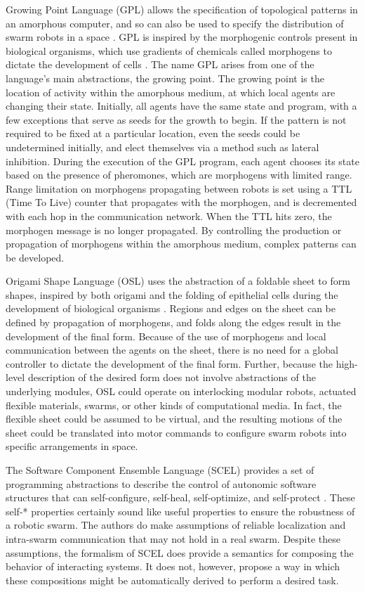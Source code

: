 \documentclass[]{article}
\begin{document}
Growing Point Language (GPL) allows the specification of topological patterns in an amorphous computer, and so can also be used to specify the distribution of swarm robots in a space \cite{nagpal2004engineering}. 
GPL is inspired by the morphogenic controls present in biological organisms, which use gradients of chemicals called morphogens to dictate the development of cells \cite{turing1952chemical}.
The name GPL arises from one of the language's main abstractions, the growing point. 
The growing point is the location of activity within the amorphous medium, at which local agents are changing their state. 
Initially, all agents have the same state and program, with a few exceptions that serve as seeds for the growth to begin. 
If the pattern is not required to be fixed at a particular location, even the seeds could be undetermined initially, and elect themselves via a method such as lateral inhibition. 
During the execution of the GPL program, each agent chooses its state based on the presence of pheromones, which are morphogens with limited range. 
Range limitation on morphogens propagating between robots is set using a TTL (Time To Live) counter that propagates with the morphogen, and is decremented with each hop in the communication network. 
When the TTL hits zero, the morphogen message is no longer propagated. 
By controlling the production or propagation of morphogens within the amorphous medium, complex patterns can be developed. 

Origami Shape Language (OSL) uses the abstraction of a foldable sheet to form shapes, inspired by both origami and the folding of epithelial cells during the development of biological organisms \cite{nagpal2004engineering, nagpal2001programmable}.
Regions and edges on the sheet can be defined by propagation of morphogens, and folds along the edges result in the development of the final form.
Because of the use of morphogens and local communication between the agents on the sheet, there is no need for a global controller to dictate the development of the final form. 
Further, because the high-level description of the desired form does not involve abstractions of the underlying modules, OSL could operate on interlocking modular robots, actuated flexible materials, swarms, or other kinds of computational media. 
In fact, the flexible sheet could be assumed to be virtual, and the resulting motions of the sheet could be translated into motor commands to configure swarm robots into specific arrangements in space. 

The Software Component Ensemble Language (SCEL) provides a set of programming abstractions to describe the control of autonomic software structures that can self-configure, self-heal, self-optimize, and self-protect \cite{nicola2014formal}. 
These self-* properties certainly sound like useful properties to ensure the robustness of a robotic swarm. 
The authors do make assumptions of reliable localization and intra-swarm communication that may not hold in a real swarm. 
Despite these assumptions, the formalism of SCEL does provide a semantics for composing the behavior of interacting systems. 
It does not, however, propose a way in which these compositions might be automatically derived to perform a desired task. 
\end{document}
